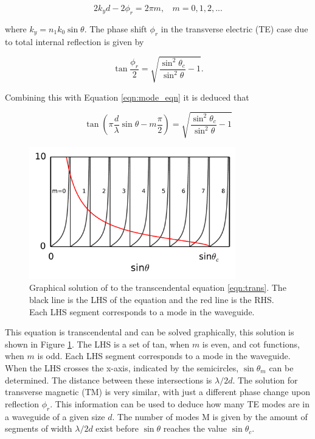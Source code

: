 \begin{equation}\label{eqn:mode_eqn} 2 k_y d - 2 \phi_r = 2\pi m, \ \ \ \ m =
\mathrm{0, 1, 2,...} \end{equation}

where $k_y = n_1 k_0 \sin{\theta}$. The phase shift $\phi_r$ in the transverse
electric (TE) case due to total internal reflection is given by

\begin{equation} \tan{\frac{\phi_r}{2}} =
\sqrt{\frac{\sin^2\theta_c}{\sin^2\theta} - 1}. \end{equation}

Combining this with Equation \ref{eqn:mode_eqn} it is deduced that

\begin{equation}\label{eqn:trans} \tan \left( \pi \frac{d}{\lambda} \sin \theta -
m \frac{\pi}{2} \right) = \sqrt{\frac{\sin^2\theta_c}{\sin^2\theta} - 1}
\end{equation}

\begin{figure}[h!] \begin{center}
\includegraphics[width=0.8\textwidth]{images/mode.pdf} \end{center}
\caption{Graphical solution of to the transcendental equation \ref{eqn:trans}. The black line is the
LHS of the equation and the red line is the RHS. Each LHS segment corresponds to
a mode in the waveguide.} \label{fig:mode} \end{figure}

This equation is transcendental and can be solved graphically, this solution is
shown in Figure \ref{fig:mode}. The LHS is a set of tan, when $m$ is even, and
cot functions, when $m$ is odd. Each LHS segment corresponds to a mode in the
waveguide. When the LHS crosses the x-axis, indicated by the semicircles, $\sin
\theta_m$ can be determined. The distance between these intersections is
$\lambda/2d$. The solution for transverse magnetic (TM) is very similar, with
just a different phase change upon reflection $\phi_r$. This information can be
used to deduce how many TE modes are in a waveguide of a given size $d$. The
number of modes M is given by the amount of segments of width $\lambda/2d$ exist
before $\sin \theta$ reaches the value $\sin \theta_c$.

